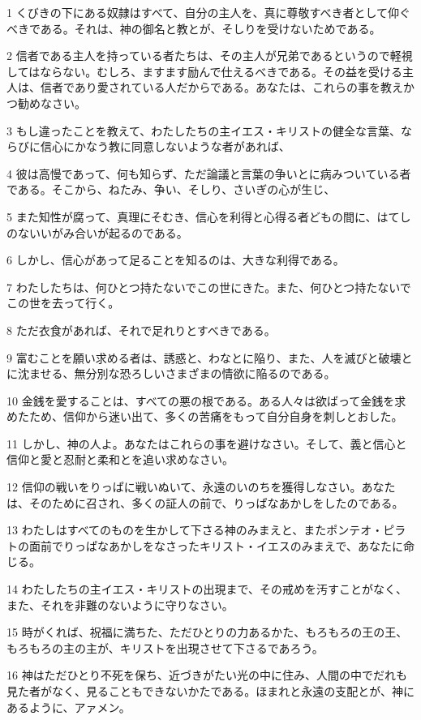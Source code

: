 \par 1 くびきの下にある奴隷はすべて、自分の主人を、真に尊敬すべき者として仰ぐべきである。それは、神の御名と教とが、そしりを受けないためである。
\par 2 信者である主人を持っている者たちは、その主人が兄弟であるというので軽視してはならない。むしろ、ますます励んで仕えるべきである。その益を受ける主人は、信者であり愛されている人だからである。あなたは、これらの事を教えかつ勧めなさい。
\par 3 もし違ったことを教えて、わたしたちの主イエス・キリストの健全な言葉、ならびに信心にかなう教に同意しないような者があれば、
\par 4 彼は高慢であって、何も知らず、ただ論議と言葉の争いとに病みついている者である。そこから、ねたみ、争い、そしり、さいぎの心が生じ、
\par 5 また知性が腐って、真理にそむき、信心を利得と心得る者どもの間に、はてしのないいがみ合いが起るのである。
\par 6 しかし、信心があって足ることを知るのは、大きな利得である。
\par 7 わたしたちは、何ひとつ持たないでこの世にきた。また、何ひとつ持たないでこの世を去って行く。
\par 8 ただ衣食があれば、それで足れりとすべきである。
\par 9 富むことを願い求める者は、誘惑と、わなとに陥り、また、人を滅びと破壊とに沈ませる、無分別な恐ろしいさまざまの情欲に陥るのである。
\par 10 金銭を愛することは、すべての悪の根である。ある人々は欲ばって金銭を求めたため、信仰から迷い出て、多くの苦痛をもって自分自身を刺しとおした。
\par 11 しかし、神の人よ。あなたはこれらの事を避けなさい。そして、義と信心と信仰と愛と忍耐と柔和とを追い求めなさい。
\par 12 信仰の戦いをりっぱに戦いぬいて、永遠のいのちを獲得しなさい。あなたは、そのために召され、多くの証人の前で、りっぱなあかしをしたのである。
\par 13 わたしはすべてのものを生かして下さる神のみまえと、またポンテオ・ピラトの面前でりっぱなあかしをなさったキリスト・イエスのみまえで、あなたに命じる。
\par 14 わたしたちの主イエス・キリストの出現まで、その戒めを汚すことがなく、また、それを非難のないように守りなさい。
\par 15 時がくれば、祝福に満ちた、ただひとりの力あるかた、もろもろの王の王、もろもろの主の主が、キリストを出現させて下さるであろう。
\par 16 神はただひとり不死を保ち、近づきがたい光の中に住み、人間の中でだれも見た者がなく、見ることもできないかたである。ほまれと永遠の支配とが、神にあるように、アァメン。
